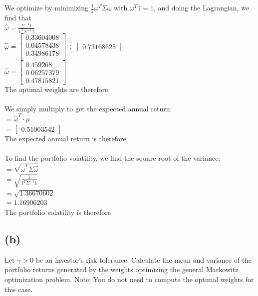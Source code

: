 \documentclass{article}
\begin{document}
{We optimize by minimizing $\frac{1}{2} \omega^T \Sigma \omega$ with $\omega^T 1 = 1$, and doing the Lagrangian, we find that \\
$\widehat{\omega} = \frac{\Sigma^{-1}1}{1^T\Sigma^{-1}1}$ \\
$\widehat{\omega} = 
\begin{bmatrix}
  0.33604008 \\ 
  0.04578438 \\ 
  0.34986178 \\ 
\end{bmatrix} 
\div
\begin{bmatrix}
  0.73168625
\end{bmatrix}$ \\
$\widehat{\omega} = 
\begin{bmatrix}
  0.459268 \\ 
  0.06257379 \\
  0.47815821
\end{bmatrix}$ \\
The optimal weights are therefore  \\ \\ 
We simply multiply to get the expected annual return: \\
$= \widehat{\omega}^T \cdot  \mu$ \\
$=
\begin{bmatrix}
  0.51003542
\end{bmatrix}$ \\
The expected annual return is therefore  \\ \\
To find the portfolio volatility, we find the square root of the variance: \\
$= \sqrt{\widehat{\omega}^T \Sigma \widehat{\omega}}$ \\
$= \sqrt{\frac{1}{1^T \Sigma^{-1} 1}}$ \\
$= \sqrt{1.36670602}$ \\
$= 1.16906203$ \\
The portfolio volatility is therefore 

\subsection*{(b)}

Let $\gamma > 0$ be an investor’s risk tolerance. Calculate the mean and variance of the portfolio returns generated by the weights optimizing the general Markowitz optimization problem. Note: You do not need to compute the optimal weights for this case. \\ \\

}
\end{document}
